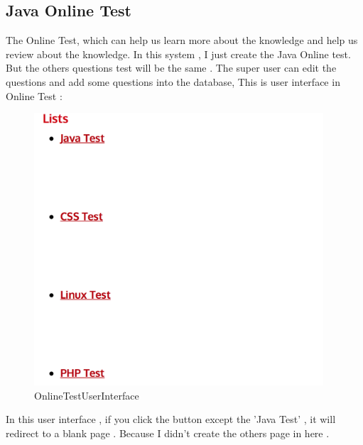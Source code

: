 \documentclass[12pt]{article}
\begin{document}
\subsection{Java Online Test}
The Online Test, which can help us learn more about the knowledge and help us review about the knowledge. In this system , I just create the Java Online test. But the others questions test will be the same . The super user can edit the questions and add some questions into the database, This is user interface in Online Test :
\begin{figure}[H]
	\centering	

	\includegraphics[height=4in]{images/OnlineTestUserInterface.jpg}

	\caption[OnlineTestUserInterface]{OnlineTestUserInterface}
	\label{OnlineTestUserInterface}
\end{figure}



	In this user interface , if you click the button except the 'Java Test' , it will redirect to a blank page . Because I didn't create the others page in here . 
	
\end{document}

